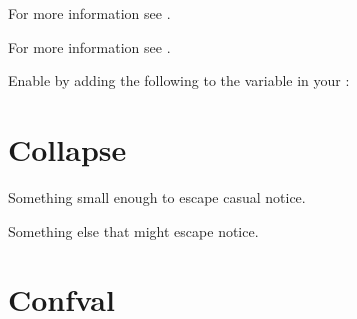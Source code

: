 \documentclass[letterpaper,10pt,english]{sphinxmanual}
\begin{document}
For more information see  .


\label{\detokenize{installation:extensions-4}}

\begin{sphinxVerbatim}[commandchars=\\\{\}]
  \PYG{p}{[}
    \PYG{p}{]}
\end{sphinxVerbatim}

For more information see  .


\label{\detokenize{installation:extensions-5}}

\vspace{10px}

Enable  by adding the following
to the  variable in your :

\begin{sphinxVerbatim}[commandchars=\\\{\}]
  \PYG{p}{[}
    \PYG{p}{]}
\end{sphinxVerbatim}



\chapter{Collapse}
\label{\detokenize{collapse:collapse}}\label{\detokenize{collapse::doc}}
Something small enough to escape casual notice.

Something else that might escape notice.


\chapter{Confval}
\label{\detokenize{confval:confval}}\label{\detokenize{confval::doc}}

\vspace{5px}
\end{document}
